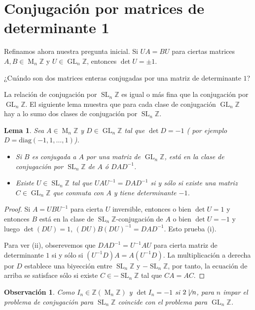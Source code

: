 \documentclass[11pt,a4paper]{amsart}
\newcommand{\Z}{\mathbb{Z}}
\DeclareMathOperator{\M}{M}
\DeclareMathOperator{\GL}{GL}
\DeclareMathOperator{\SL}{SL}
\numberwithin{equation}{section}
\theoremstyle{plain}
\newtheorem{lem}[equation]{Lema}
\newtheorem{obs}[equation]{Observación}
\begin{document}
\section{Conjugación por matrices de determinante 1}\label{sec:SL}

Refinamos ahora nuestra pregunta inicial. Si $UA = BU$
para ciertas matrices $A,B \in \M_n \Z$ y $U \in \GL_n \Z$,
entonces $\det U = \pm 1$.

\begin{tcolorbox}[colback=thmcol!30, sharp corners, colframe=white]
\begin{center}
¿Cuándo son dos matrices enteras
conjugadas por una matriz de determinante $1$?
\end{center}
\end{tcolorbox}

La relación de conjugación por $\SL_n \Z$
es igual o más fina que la conjugación por $\GL_n \Z$.
El siguiente lema muestra que para cada clase de conjugación
$\GL_n \Z$ hay a lo sumo dos clases de conjugación por $\SL_n \Z$.

\begin{lem} \label{lem:sl=gl}
Sea $A \in \M_n \Z$ y $D \in \GL_n \Z$ tal que $\det D = -1$ (
por ejemplo $D=\mathrm{diag}(-1,1,\ldots,1)$).
\begin{itemize}
  \item[(i)] Si $B$ es conjugada a $A$ por una matriz de $\GL_n \Z$,
  está en la clase de conjugación por $\SL_n \Z$ de $A$ ó $DAD^{-1}$.
  \item[(ii)] Existe $U \in \SL_n \Z$ tal que $UAU^{-1} = DAD^{-1}$
  si y sólo si existe una matriz $C \in \GL_n \Z$ que conmuta con $A$ y tiene
  determinante $-1$.
\end{itemize}
\end{lem}
\begin{proof} Si $A = UBU^{-1}$ para cierta $U$ inversible, entonces
o bien $\det U = 1$ y entonces $B$ está en la clase de $\SL_n \Z$-conjugación
de $A$ o bien $\det U = -1$ y luego $\det(DU) = 1$,
$(DU)B(DU)^{-1} = DAD^{-1}$. Esto prueba (i).

Para ver (ii), obserevemos que $DAD^{-1} = U^{-1}AU$ para cierta matriz
de determinante $1$ si y sólo si $(U^{-1}D)A = A(U^{-1}D)$.
La multiplicación a derecha por $D$ establece una biyección entre
$\SL_n \Z$ y $-\SL_n \Z$, por tanto, la ecuación de arriba se satisface
sólo si existe $C \in -\SL_n \Z$ tal que $CA = AC$.
\end{proof}

\begin{obs} Como $I_n \in \Z(\M_n \Z)$
y $\det I_n = -1$ si $2 \not \mid n$, para $n$ impar el problema
de conjugación para $\SL_n \Z$ coincide con el problema para $\GL_n \Z$.
\end{obs}
\end{document}
